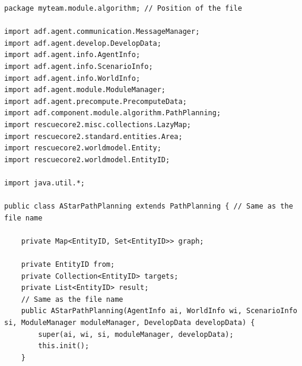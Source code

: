 \documentclass{article}
\begin{document}
\begin{lstlisting}[caption=Part of AStarPlanning.java,label=astarpathplan1]
package myteam.module.algorithm; // Position of the file

import adf.agent.communication.MessageManager;
import adf.agent.develop.DevelopData;
import adf.agent.info.AgentInfo;
import adf.agent.info.ScenarioInfo;
import adf.agent.info.WorldInfo;
import adf.agent.module.ModuleManager;
import adf.agent.precompute.PrecomputeData;
import adf.component.module.algorithm.PathPlanning;
import rescuecore2.misc.collections.LazyMap;
import rescuecore2.standard.entities.Area;
import rescuecore2.worldmodel.Entity;
import rescuecore2.worldmodel.EntityID;

import java.util.*;

public class AStarPathPlanning extends PathPlanning { // Same as the file name

    private Map<EntityID, Set<EntityID>> graph;

    private EntityID from;
    private Collection<EntityID> targets;
    private List<EntityID> result;
    // Same as the file name
    public AStarPathPlanning(AgentInfo ai, WorldInfo wi, ScenarioInfo si, ModuleManager moduleManager, DevelopData developData) {
        super(ai, wi, si, moduleManager, developData);
        this.init();
    }
\end{lstlisting}
\end{document}
